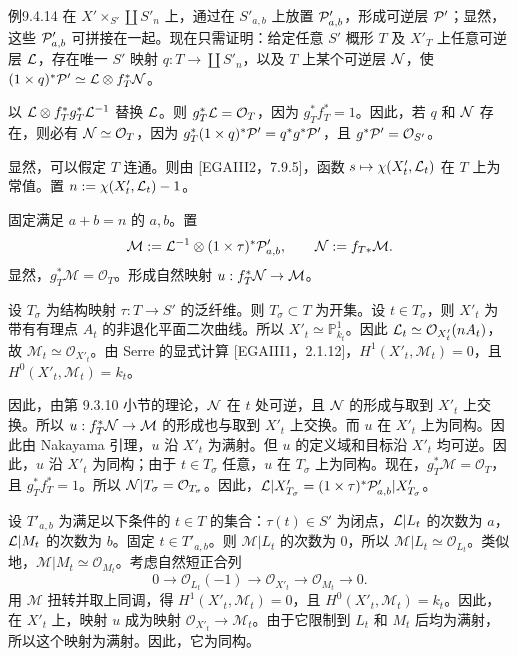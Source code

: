 \begin{origstatement}{例}{9.4.14}
在 $X'\times_{S'}\coprod S'_n$ 上，通过在 $S'_{a,b}$ 上放置 $\mathcal P'_{a,b}$，形成可逆层 $\mathcal P'$；显然，这些 $\mathcal P'_{a,b}$ 可拼接在一起。现在只需证明：给定任意 $S'$ 概形 $T$ 及 $X'_T$ 上任意可逆层 $\mathcal L$，存在唯一 $S'$ 映射 $q:T\to\coprod S'_n$，以及 $T$ 上某个可逆层 $\mathcal N$，使 $(1\times q)^*\mathcal P'\simeq\mathcal L\otimes f_T^*\mathcal N$。

以 $\mathcal L\otimes f_T^*g_T^*\mathcal L^{-1}$ 替换 $\mathcal L$。则 $g_T^*\mathcal L=\mathcal O_T$，因为 $g_T^*f_T^*=1$。因此，若 $q$ 和 $\mathcal N$ 存在，则必有 $\mathcal N\simeq\mathcal O_T$，因为 $g_T^*(1\times q)^*\mathcal P'=q^*g^*\mathcal P'$，且 $g^*\mathcal P'=\mathcal O_{S'}$。

显然，可以假定 $T$ 连通。则由 [EGAIII2，7.9.5]，函数 $s\mapsto\chi(X'_t,\mathcal L_t)$ 在 $T$ 上为常值。置 $n:=\chi(X'_t,\mathcal L_t)-1$。

固定满足 $a+b=n$ 的 $a,b$。置
\[
\mathcal M:=\mathcal L^{-1}\otimes(1\times\tau)^*\mathcal P'_{a,b},\qquad
\mathcal N:=f_{T*}\mathcal M.
\]
显然，$g_T^*\mathcal M=\mathcal O_T$。形成自然映射 $u:f_T^*\mathcal N\to\mathcal M$。

设 $T_\sigma$ 为结构映射 $\tau:T\to S'$ 的泛纤维。则 $T_\sigma\subset T$ 为开集。设 $t\in T_\sigma$，则 $X'_t$ 为带有有理点 $A_t$ 的非退化平面二次曲线。所以 $X'_t\simeq\mathbb P_{k_t}^1$。因此 $\mathcal L_t\simeq\mathcal O_{X'_t}(nA_t)$，故 $\mathcal M_t\simeq\mathcal O_{X'_t}$。由 Serre 的显式计算 [EGAIII1，2.1.12]，$H^1(X'_t,\mathcal M_t)=0$，且 $H^0(X'_t,\mathcal M_t)=k_t$。

因此，由第 9.3.10 小节的理论，$\mathcal N$ 在 $t$ 处可逆，且 $\mathcal N$ 的形成与取到 $X'_t$ 上交换。所以 $u:f_T^*\mathcal N\to\mathcal M$ 的形成也与取到 $X'_t$ 上交换。而 $u$ 在 $X'_t$ 上为同构。因此由 Nakayama 引理，$u$ 沿 $X'_t$ 为满射。但 $u$ 的定义域和目标沿 $X'_t$ 均可逆。因此，$u$ 沿 $X'_t$ 为同构；由于 $t\in T_\sigma$ 任意，$u$ 在 $T_\sigma$ 上为同构。现在，$g_T^*\mathcal M=\mathcal O_T$，且 $g_T^*f_T^*=1$。所以 $\mathcal N|T_\sigma=\mathcal O_{T_\sigma}$。因此，$\mathcal L|X'_{T_\sigma}=(1\times\tau)^*\mathcal P'_{a,b}|X'_{T_\sigma}$。

设 $T'_{a,b}$ 为满足以下条件的 $t\in T$ 的集合：$\tau(t)\in S'$ 为闭点，$\mathcal L|L_t$ 的次数为 $a$，$\mathcal L|M_t$ 的次数为 $b$。固定 $t\in T'_{a,b}$。则 $\mathcal M|L_t$ 的次数为 $0$，所以 $\mathcal M|L_t\simeq\mathcal O_{L_t}$。类似地，$\mathcal M|M_t\simeq\mathcal O_{M_t}$。考虑自然短正合列
\[
0\longrightarrow\mathcal O_{L_t}(-1)\longrightarrow\mathcal O_{X'_t}
\longrightarrow\mathcal O_{M_t}\longrightarrow0.
\]
用 $\mathcal M$ 扭转并取上同调，得 $H^1(X'_t,\mathcal M_t)=0$，且 $H^0(X'_t,\mathcal M_t)=k_t$。因此，在 $X'_t$ 上，映射 $u$ 成为映射 $\mathcal O_{X'_t}\to\mathcal M_t$。由于它限制到 $L_t$ 和 $M_t$ 后均为满射，所以这个映射为满射。因此，它为同构。


\end{origstatement}
